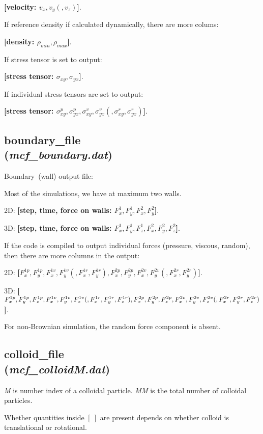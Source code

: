 \documentclass[a4paper,10pt]{article}
\begin{document}
\textbf{[velocity: $v_x, v_y(, v_z)$]}.

If reference density if calculated dynamically,
there are more colums:

\textbf{[density: $\rho_{min}, \rho_{max}$]}.

If stress tensor is set to output:

\textbf{[stress tensor: $\sigma_{xy}, \sigma_{yx}$]}.

If individual stress tensors are set to output:

\textbf{[stress tensor: 
$\sigma^p_{xy}, \sigma^p_{yx},
\sigma^v_{xy}, \sigma^v_{yx}
(,\sigma^r_{xy}, \sigma^r_{yx})$]}.

\subsection{\textbf{boundary\_file}\\
(\textit{mcf\_boundary.dat})}
Boundary~(wall) output file:

Most of the simulations, we have at maximum two walls.


2D: \textbf{[step, time, force on walls:  $F^1_x, F^1_y, F^2_x, F^2_y$]}.

3D: \textbf{[step, time, force on walls:  $F^1_x, F^1_y, F^1_z, F^2_x, F^2_y, F^2_z$]}.

If the code is compiled to output individual forces (pressure, viscous, random),
then there are more columns in the output:

2D: \textbf{[$F^{1p}_x, F^{1p}_y, 
F^{1v}_x, F^{1v}_y
(,F^{1r}_x, F^{1r}_y),
F^{2p}_x, F^{2p}_y, 
F^{2v}_x, F^{2v}_y
(,F^{2r}_x, F^{2r}_y)$]}.

3D: \textbf{[$F^{1p}_x, F^{1p}_y, F^{1p}_z, 
F^{1v}_x, F^{1v}_y, F^{1v}_z
(,F^{1r}_x, F^{1r}_y, F^{1r}_z),\\
F^{2p}_x, F^{2p}_y, F^{2p}_z, 
F^{2v}_x, F^{2v}_y, F^{2v}_z
(,F^{2r}_x, F^{2r}_y, F^{2r}_z)$]}.

For non-Brownian simulation, the random force component is absent.

\subsection{\textbf{colloid\_file}\\
(\textit{mcf\_colloidM.dat})}
\textit{M} is number index of a colloidal particle.
\textit{MM} is the total number of colloidal particles.

Whether quantities inside $[~]$ are present depends
on whether colloid is translational or rotational.
\end{document}
